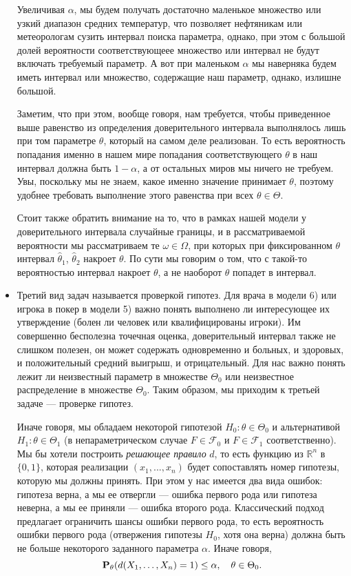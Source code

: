 \documentclass[10 pt,russian]{article}
\begin{document}
\begin{itemize}
Увеличивая $\alpha$, мы будем получать достаточно маленькое множество или узкий диапазон средних температур, что позволяет нефтяникам или метеорологам сузить интервал поиска параметра, однако, при этом с большой долей вероятности соответствующеее множество или интервал не будут включать требуемый параметр. А вот при маленьком $\alpha$ мы наверняка будем иметь интервал или множество, содержащие наш параметр, однако, излишне большой.

Заметим, что при этом, вообще говоря, нам требуется, чтобы приведенное выше равенство из определения доверительного интервала выполнялось лишь при том параметре $\theta$, который на самом деле реализован. То есть вероятность попадания именно в нашем мире попадания соответствующего $\theta$ в наш интервал должна быть $1-\alpha$, а от остальных миров мы ничего не требуем. Увы, поскольку мы не знаем, какое именно значение принимает $\theta$, поэтому удобнее требовать выполнение этого равенства при всех $\theta\in \Theta$.

Стоит также обратить внимание на то, что в рамках нашей модели у доверительного интервала случайные границы, и в рассматриваемой вероятности мы рассматриваем те $\omega\in \Omega$, при которых при фиксированном $\theta$ интервал $\widehat{\theta}_1$, $\widehat{\theta}_2$ накроет $\theta$. По сути мы говорим о том, что с такой-то вероятностью интервал накроет $\theta$, а не наоборот $\theta$ попадет в интервал.
\item Третий вид задач называется проверкой гипотез. Для врача в модели 6) или игрока в покер в модели 5) важно понять выполнено ли интересующее их утверждение (болен ли человек или квалифицированы игроки). Им совершенно бесполезна точечная оценка, доверительный интервал также не слишком полезен, он может содержать одновременно и больных, и здоровых, и положительный средний выигрыш, и отрицательный.  Для нас важно понять лежит ли неизвестный параметр в множестве $\Theta_0$ или неизвестное распределение в множестве $\Theta_0$. Таким образом, мы приходим к третьей задаче --- проверке гипотез.

Иначе говоря, мы обладаем некоторой гипотезой $H_0: \theta\in \Theta_0$ и альтернативой $H_1:\theta\in\Theta_1$ (в непараметрическом случае $F\in \mathcal{F}_0$ и $F\in\mathcal{F}_1$ соответственно). Мы бы хотели построить {\it решающее правило} $d$, то есть функцию из $\mathbb{R}^n$ в $\{0,1\}$, которая реализации $(x_1,...,x_n)$ будет сопоставлять номер гипотезы, которую мы должны принять. При этом у нас имеется два вида ошибок: гипотеза верна, а мы ее отвергли --- ошибка первого рода или гипотеза неверна, а мы ее приняли --- ошибка второго рода. Классический подход предлагает ограничить шансы ошибки первого рода, то есть вероятность  ошибки первого рода (отвержения гипотезы $H_0$, хотя она верна) должна быть не больше некоторого заданного параметра $\alpha$. Иначе говоря,
$${\bf P}_{\theta}(d(X_1,\dotsc, X_n)=1)\le \alpha, \quad \theta \in \Theta_0.$$ 


\end{itemize}
\end{document}
